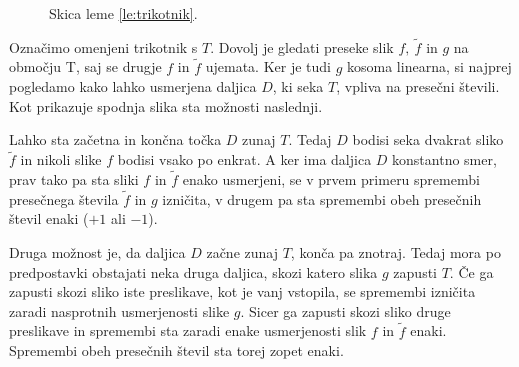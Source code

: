 \documentclass[mat1]{fmfdelo}
\begin{document}
\begin{figure}[h!]
\centering
{}
\caption{Skica leme \ref{le:trikotnik}.}
\end{figure}

\proof
Označimo omenjeni trikotnik s $T$. Dovolj je gledati preseke slik $f,\ \widetilde{f}$ in $g$ na območju T, saj se drugje $f$ in $\widetilde{f}$ ujemata. Ker je tudi $g$ kosoma linearna, si najprej pogledamo kako lahko usmerjena daljica $D$, ki seka $T$, vpliva na presečni števili. Kot prikazuje spodnja slika sta možnosti naslednji.

Lahko sta začetna in končna točka $D$ zunaj $T$. Tedaj $D$ bodisi seka dvakrat sliko $\widetilde{f}$ in nikoli slike $f$ bodisi vsako po enkrat. A ker ima daljica $D$ konstantno smer, prav tako pa sta sliki $f$ in $\widetilde{f}$ enako usmerjeni, se v prvem primeru spremembi presečnega števila $\widetilde{f}$ in $g$ izničita, v drugem pa sta spremembi obeh presečnih števil enaki ($+1$ ali $-1$).

Druga možnost je, da daljica $D$ začne zunaj $T$, konča pa znotraj. Tedaj mora po predpostavki obstajati neka druga daljica, skozi katero slika $g$ zapusti $T$. Če ga zapusti skozi sliko iste preslikave, kot je vanj vstopila, se spremembi izničita zaradi nasprotnih usmerjenosti slike $g$. Sicer ga zapusti skozi sliko druge preslikave in spremembi sta zaradi enake usmerjenosti slik $f$ in $\widetilde{f}$ enaki. Spremembi obeh presečnih števil sta torej zopet enaki.


\begin{center}
\end{center}
\end{document}
